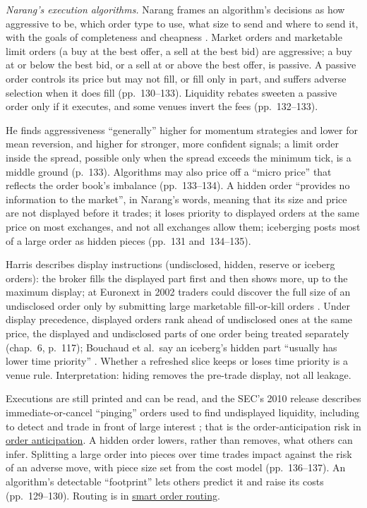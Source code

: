 \begin{qfdefinition}
\emph{Narang's execution algorithms.} Narang frames an algorithm's decisions as how aggressive to be, which order type to use, what size to send and where to send it, with the goals of completeness and cheapness \citep[chap.~7, ``Execution'', sec.~7.1, pp.~129--130]{s7-narang}. Market orders and marketable limit orders (a buy at the best offer, a sell at the best bid) are aggressive; a buy at or below the best bid, or a sell at or above the best offer, is passive. A passive order controls its price but may not fill, or fill only in part, and suffers adverse selection when it does fill (pp.~130--133). Liquidity rebates sweeten a passive order only if it executes, and some venues invert the fees (pp.~132--133).

He finds aggressiveness ``generally'' higher for momentum strategies and lower for mean reversion, and higher for stronger, more confident signals; a limit order inside the spread, possible only when the spread exceeds the minimum tick, is a middle ground (p.~133). Algorithms may also price off a ``micro price'' that reflects the order book's imbalance (pp.~133--134). A hidden order ``provides no information to the market'', in Narang's words, meaning that its size and price are not displayed before it trades; it loses priority to displayed orders at the same price on most exchanges, and not all exchanges allow them; iceberging posts most of a large order as hidden pieces (pp.~131 and~134--135).

Harris describes display instructions (undisclosed, hidden, reserve or iceberg orders): the broker fills the displayed part first and then shows more, up to the maximum display; at Euronext in 2002 traders could discover the full size of an undisclosed order only by submitting large marketable fill-or-kill orders \citep[chap.~4, sec.~4.11.2, pp.~84--85]{alpha-harris}. Under display precedence, displayed orders rank ahead of undisclosed ones at the same price, the displayed and undisclosed parts of one order being treated separately (chap.~6, p.~117); Bouchaud et al.\ say an iceberg's hidden part ``usually has lower time priority'' \citep[chap.~3, sec.~3.2.2, p.~55]{catalogue-0528}. Whether a refreshed slice keeps or loses time priority is a venue rule. Interpretation: hiding removes the pre-trade display, not all leakage.

Executions are still printed and can be read, and the SEC's 2010 release describes immediate-or-cancel ``pinging'' orders used to find undisplayed liquidity, including to detect and trade in front of large interest \citep[p.~47, n.~69]{sec-concept-release-2010}; that is the order-anticipation risk in \hyperref[def:order-anticipation]{order anticipation}. A hidden order lowers, rather than removes, what others can infer. Splitting a large order into pieces over time trades impact against the risk of an adverse move, with piece size set from the cost model (pp.~136--137). An algorithm's detectable ``footprint'' lets others predict it and raise its costs (pp.~129--130). Routing is in \hyperref[def:smart-order-routing]{smart order routing}.


\end{qfdefinition}
